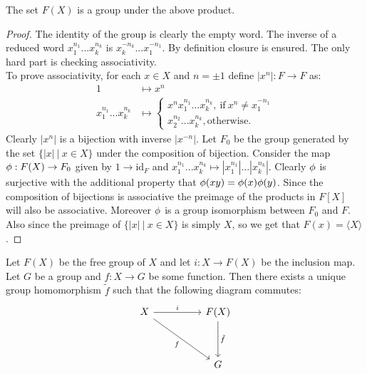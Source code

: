 \begin{proposition}
  The set $F(X)$ is a group under the above product.
\end{proposition}
\begin{proof}
  The identity of the group is clearly the empty word. The inverse of a reduced word $x_1^{n_1}...x_k^{n_k}$ is $x_k^{-n_k}...x_1^{-n_1}$. By definition closure is ensured. The only hard part is checking associativity.\\

  To prove associativity, for each $x\in X$ and $n = \pm 1$ define $|x^n|: F\to F$ as:
  \begin{align*}
    1 &\mapsto x^n\\
    x_1^{n_1}...x_k^{n_k} &\mapsto \begin{cases}
      x^nx_1^{n_1}...x_k^{n_k},\ \text{if}\ x^n \neq x_1^{-n_1}\\
      x_2^{n_2}...x_k^{n_k}, \text{otherwise}. 
    \end{cases}
  \end{align*}
  Clearly $|x^n|$ is a bijection with inverse $|x^{-n}|$. Let $F_0$ be the group generated by the set $\{|x|\ |\ x\in X\}$ under the composition of bijection. Consider the map $\phi: F(X)\to F_0$ given by $1\to \text{id}_F$ and $x_1^{n_1}...x_k^{n_k}\mapsto |x_1^{n_1}|...|x_k^{n_k}|$. Clearly $\phi$ is surjective with the additional property that $\phi(xy) = \phi(x)\phi(y)$. Since the composition of bijections is associative the preimage of the products in $F[X]$ will also be associative. Moreover $\phi$ is a group isomorphism between $F_0$ and $F$. Also since the preimage of $\{|x|\ |\ x\in X\}$ is simply $X$, so we get that $F(x) = \langle X \rangle$.
\end{proof}
\begin{theorem}
  Let $F(X)$ be the free group of $X$ and let $i:X\to F(X)$ be the inclusion map. Let $G$ be a group and $f:X\to G$ be some function. Then there exists a unique group homomorphism $\tilde{f}$ such that the following diagram commutes:
  \[
    \begin{tikzcd}[sep=huge]
      X \arrow{r}{i} \arrow[swap]{dr}{f} & F(X) \arrow{d}{\tilde{f}} \\ & G 
    \end{tikzcd}
  \]
\end{theorem}

